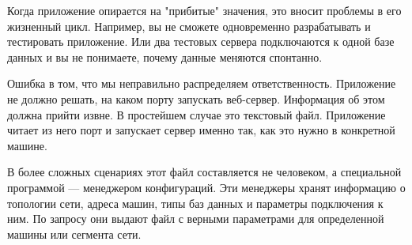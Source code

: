 
Когда приложение опирается на "прибитые" значения, это вносит проблемы в его
жизненный цикл. Например, вы не сможете одновременно разрабатывать и тестировать
приложение. Или два тестовых сервера подключаются к одной базе данных и вы не
понимаете, почему данные меняются спонтанно.

Ошибка в том, что мы неправильно распределяем ответственность. Приложение не
должно решать, на каком порту запускать веб-сервер. Информация об этом должна
прийти извне. В простейшем случае это текстовый файл. Приложение читает из него
порт и запускает сервер именно так, как это нужно в конкретной машине.

В более сложных сценариях этот файл составляется не человеком, а специальной
программой — менеджером конфигураций. Эти менеджеры хранят информацию о
топологии сети, адреса машин, типы баз данных и параметры подключения к ним. По
запросу они выдают файл с верными параметрами для определенной машины или
сегмента сети.
